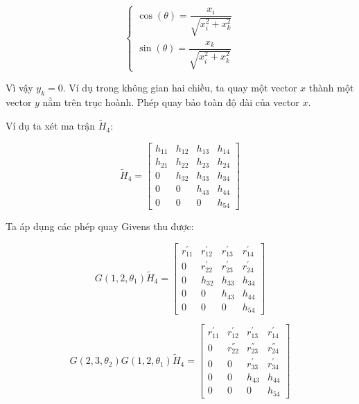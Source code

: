 \documentclass[14pt, a4paper]{article}
\numberwithin{equation}{section}
\numberwithin{algorithm}{section}
\numberwithin{figure}{section}
\numberwithin{dl}{section}
\numberwithin{md}{section}
\numberwithin{bd}{section}
\numberwithin{dn}{section}
\begin{document}
\begin{equation}
    \begin{cases}
        \cos(\theta) = \dfrac{x_i}{\sqrt{x_i^2 + x_k^2}} \\
        \sin(\theta) = \dfrac{x_k}{\sqrt{x_i^2 + x_k^2}}
    \end{cases}
\end{equation}

Vì vậy $y_k = 0$. Ví dụ trong không gian hai chiều, ta quay một vector $x$ thành một vector $y$ nằm trên trục hoành. Phép quay bảo toàn độ dài của vector $x$.

Ví dụ ta xét ma trận $\widetilde{H}_4$:

\begin{equation}
    \widetilde{H}_4 = \begin{bmatrix} h_{11} & h_{12} & h_{13} & h_{14} \\
                                    h_{21} & h_{22} & h_{23} & h_{24} \\
                                    0 & h_{32} & h_{33} & h_{34} \\
                                    0 & 0 & h_{43} & h_{44} \\
                                    0 & 0 & 0 & h_{54}  \end{bmatrix}
\end{equation}

Ta áp dụng các phép quay Givens thu được:

\begin{equation}
    G(1, 2, \theta_1) \widetilde{H}_4 = \begin{bmatrix} r_{11}^{'} & r_{12}^{'} & r_{13}^{'} & r_{14}^{'} \\
        0 & r_{22}^{'} & r_{23}^{'} & r_{24}^{'} \\
        0 & h_{32} & h_{33} & h_{34} \\
        0 & 0 & h_{43} & h_{44} \\
        0 & 0 & 0 & h_{54}  \end{bmatrix}
\end{equation}

\begin{equation}
    G(2, 3, \theta_2)G(1, 2, \theta_1) \widetilde{H}_4 = \begin{bmatrix} r_{11}^{'} & r_{12}^{'} & r_{13}^{'} & r_{14}^{'} \\
        0 & r_{22}^{''} & r_{23}^{''} & r_{24}^{''} \\
        0 & 0 & r_{33}^{'} & r_{34}^{'} \\
        0 & 0 & h_{43} & h_{44} \\
        0 & 0 & 0 & h_{54}  \end{bmatrix}
\end{equation}
\end{document}
